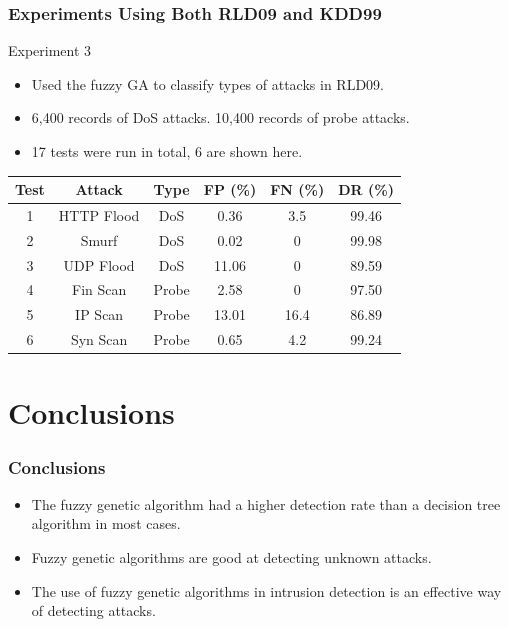 \documentclass{beamer}
\begin{document}
\begin{frame}
	\frametitle{Experiments Using Both RLD09 and KDD99}
Experiment 3
	\begin{itemize}
		\item Used the fuzzy GA to classify types of attacks in RLD09.
		\item 6,400 records of DoS attacks. 10,400 records of probe attacks.
		\item 17 tests were run in total, 6 are shown here.
	\end{itemize}
\begin{table}
\begin{tabular}{cccccc}
Test & Attack & Type & FP (\%) & FN (\%) & DR (\%)\\ \hline
1 & HTTP Flood & DoS & 0.36 & 3.5 & 99.46\\
2 & Smurf & DoS & 0.02 & 0 & 99.98\\
3 & UDP Flood & DoS & 11.06 & 0 & 89.59\\
4 & Fin Scan & Probe & 2.58 & 0 & 97.50\\
5 & IP Scan & Probe & 13.01 & 16.4 & 86.89\\
6 & Syn Scan & Probe & 0.65 & 4.2 & 99.24\\
\end{tabular}
\end{table}

\end{frame}
\section[Conclusions]{Conclusions}

\begin{frame}
\frametitle{Conclusions}
	\begin{itemize}
		\item The fuzzy genetic algorithm had a higher detection rate than a decision tree algorithm in most cases.
		\item Fuzzy genetic algorithms are good at detecting unknown attacks.
		\item The use of fuzzy genetic algorithms in intrusion detection is an effective way of detecting attacks.
	\end{itemize}
\end{frame}
\end{document}

